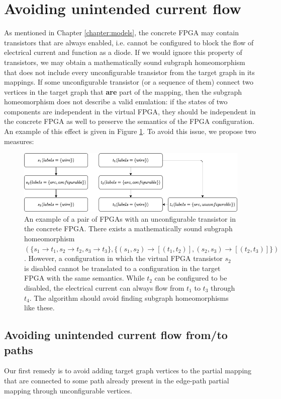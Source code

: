 \section{Avoiding unintended current flow}
\label{sec:unintendedcurrent}
As mentioned in Chapter \ref{chapter:models}, the concrete FPGA may contain transistors that are always enabled, i.e. cannot be configured to block the flow of electrical current and function as a diode. If we would ignore this property of transistors, we may obtain a mathematically sound subgraph homeomorphism that does not include every unconfigurable transistor from the target graph in its mappings. If some unconfigurable transistor (or a sequence of them) connect two vertices in the target graph that \textbf{are} part of the mapping, then the subgraph homeomorphism does not describe a valid emulation: if the states of two components are independent in the virtual FPGA, they should be independent in the concrete FPGA as well to preserve the semantics of the FPGA configuration. An example of this effect is given in Figure \ref{fig:unconfigurableExample}. To avoid this issue, we propose two measures:


\begin{figure}

  \centering
\includegraphics[scale=0.6]{images/contraction/unconfigurableExample.png}

\caption{An example of a pair of FPGAs with an unconfigurable transistor in the concrete FPGA. There exists a mathematically sound subgraph homeomorphism $(\{s_1 \to t_1, s_2 \to t_2, s_3 \to t_3\}, \{(s_1, s_2) \to [(t_1, t_2)], (s_2, s_3) \to [(t_2, t_3)]\})$. However, a configuration in which the virtual FPGA transistor $s_2$ is disabled cannot be translated to a configuration in the target FPGA with the same semantics. While $t_2$ can be configured to be disabled, the electrical current can always flow from $t_1$ to $t_3$ through $t_4$. The algorithm should avoid finding subgraph homeomorphisms like these.}

\label{fig:unconfigurableExample}
\end{figure}

\subsection{Avoiding unintended current flow from/to paths}
\label{sec:unintendedcurrent-path}
Our first remedy is to avoid adding target graph vertices to the partial mapping that are connected to some path already present in the edge-path partial mapping through unconfigurable vertices. 

